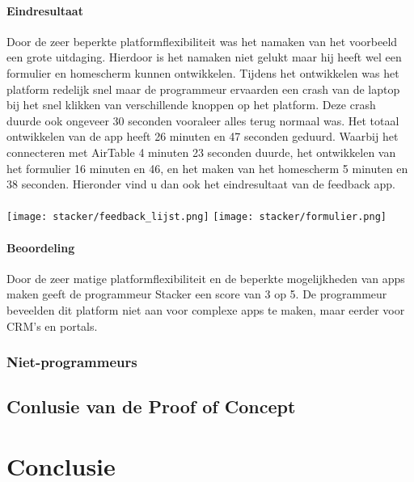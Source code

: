 \paragraph*{Eindresultaat}
Door de zeer beperkte platformflexibiliteit was het namaken van het voorbeeld een grote uitdaging. Hierdoor is het namaken niet gelukt maar hij heeft wel een formulier en homescherm
kunnen ontwikkelen. Tijdens het ontwikkelen was het platform redelijk snel maar de programmeur ervaarden een crash van de laptop bij het snel klikken van verschillende knoppen op het platform.
Deze crash duurde ook ongeveer 30 seconden vooraleer alles terug normaal was. Het totaal ontwikkelen van de app heeft 26 minuten en 47 seconden geduurd. Waarbij het connecteren met AirTable 4 minuten 23 seconden duurde, het ontwikkelen van het formulier 16 minuten en 46,
en het maken van het homescherm 5 minuten en 38 seconden. Hieronder vind u dan ook het eindresultaat van de feedback app.
\\
\\
\texttt{[image: stacker/feedback\_lijst.png]}
\texttt{[image: stacker/formulier.png]}

\paragraph*{Beoordeling}
Door de zeer matige platformflexibiliteit en de beperkte mogelijkheden van apps maken geeft de programmeur Stacker een score van 3 op 5.
De programmeur beveelden dit platform niet aan voor complexe apps te maken, maar eerder voor CRM's en portals.

\subsubsection*{Niet-programmeurs}
\subsection*{Conlusie van de Proof of Concept}

\section*{Conclusie}


